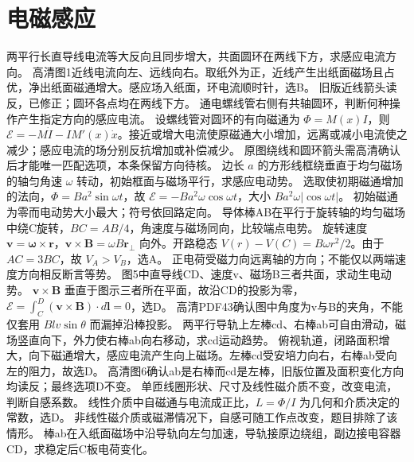 \section{电磁感应}
\problemtext 两平行长直导线电流等大反向且同步增大，共面圆环在两线下方，求感应电流方向。
\workings 高清图1近线电流向左、远线向右。取纸外为正，近线产生出纸面磁场且占优，净出纸面磁通增大。感应场入纸面，环电流顺时针，选B。
\crosscheck 旧版近线箭头读反，已修正；圆环各点均在两线下方。
\problemtext 通电螺线管右侧有共轴圆环，判断何种操作产生指定方向的感应电流。
\workings 设螺线管对圆环的有向磁通为 $\Phi=M(x)I$，则 $\mathcal E=-M\dot I-I M'(x)\dot x$。接近或增大电流使原磁通大小增加，远离或减小电流使之减少；感应电流的场分别反抗增加或补偿减少。
\crosscheck 原图绕线和圆环箭头需高清确认后才能唯一匹配选项，本条保留方向待核。
\problemtext 边长 $a$ 的方形线框绕垂直于均匀磁场的轴匀角速 $\omega$ 转动，初始框面与磁场平行，求感应电动势。
\workings 选取使初期磁通增加的法向，$\Phi=Ba^2\sin\omega t$，故 $\mathcal E=-Ba^2\omega\cos\omega t$，大小 $Ba^2\omega|\cos\omega t|$。
\crosscheck 初始磁通为零而电动势大小最大；符号依回路定向。
\problemtext 导体棒AB在平行于旋转轴的均匀磁场中绕C旋转，$BC=AB/4$，角速度与磁场同向，比较端点电势。
\workings 旋转速度 $\bm v=\bm\omega\times\bm r$，$\bm v\times\bm B=\omega B\bm r_\perp$ 向外。开路稳态 $V(r)-V(C)=B\omega r^2/2$。由于 $AC=3BC$，故 $V_A>V_B$，选A。
\crosscheck 正电荷受磁力向远离轴的方向；不能仅以两端速度方向相反断言等势。
\problemtext 图5中直导线CD、速度v、磁场B三者共面，求动生电动势。
\workings $\bm v\times\bm B$ 垂直于图示三者所在平面，故沿CD的投影为零，$\mathcal E=\int_C^D(\bm v\times\bm B)\cdot d\bm l=0$，选D。
\crosscheck 高清PDF43确认图中角度为v与B的夹角，不能仅套用 $Blv\sin\theta$ 而漏掉沿棒投影。
\problemtext 两平行导轨上左棒cd、右棒ab可自由滑动，磁场竖直向下，外力使右棒ab向右移动，求cd运动趋势。
\workings 俯视轨道，闭路面积增大，向下磁通增大，感应电流产生向上磁场。左棒cd受安培力向右，右棒ab受向左的阻力，故选D。
\crosscheck 高清图6确认ab是右棒而cd是左棒，旧版位置及面积变化方向均读反；最终选项D不变。
\problemtext 单匝线圈形状、尺寸及线性磁介质不变，改变电流，判断自感系数。
\workings 线性介质中自磁通与电流成正比，$L=\Phi/I$ 为几何和介质决定的常数，选D。
\crosscheck 非线性磁介质或磁滞情况下，自感可随工作点改变，题目排除了该情形。
\problemtext 棒ab在入纸面磁场中沿导轨向左匀加速，导轨接原边绕组，副边接电容器CD，求稳定后C板电荷变化。
